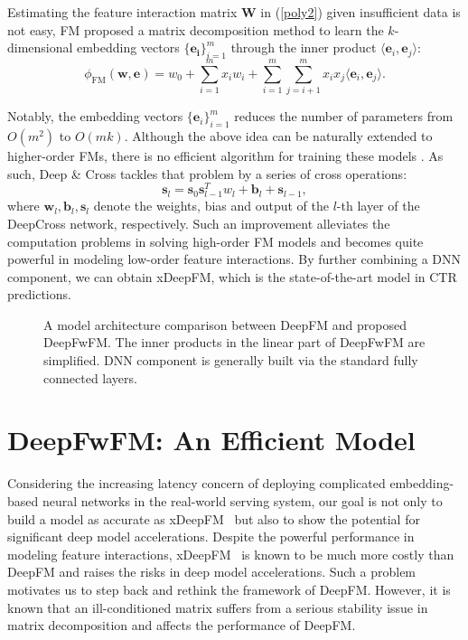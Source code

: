 \documentclass[sigconf]{acmart}
\begin{document}
Estimating the feature interaction matrix $\bm{W}$ in (\ref{poly2}) given insufficient data is not easy, FM \cite{FM} proposed a matrix decomposition method to learn the $k$-dimensional embedding vectors $\{\bm{e_i}\}_{i=1}^m$ through the inner product $\langle \bm{e}_i, \bm{e}_j\rangle$:
\begin{equation}
\label{fm}
        \phi_{\text{FM}}(\bm{w}, \bm{e})=w_0+\sum_{i=1}^m x_i w_i+\sum_{i=1}^m\sum_{j=i+1}^m x_i x_j \langle \bm{e}_i, \bm{e}_j\rangle.
\end{equation}

Notably, the embedding vectors $\{\bm{e}_i\}_{i=1}^m$ reduces the number of parameters from $O(m^2)$ to $O(mk)$. Although the above idea can be naturally extended to higher-order FMs, there is no efficient algorithm for training these models \citep{NIPS2016_6144}. As such, Deep \& Cross \citep{deepcross} tackles that problem by a series of cross operations:
\begin{equation}
    \bm{s}_l= \bm{s}_0 \bm{s}^T_{l-1} w_l+\bm{b}_l+ \bm{s}_{l-1},
\end{equation}
where $\bm{w}_l, \bm{b}_l, \bm{s}_l$ denote the weights, bias and output of the $l$-th layer of the DeepCross network, respectively. Such an improvement alleviates the computation problems in solving high-order FM models and becomes quite powerful in modeling low-order feature interactions. By further combining a DNN component, we can obtain xDeepFM\citep{xdeepfm}, which is the state-of-the-art model in CTR predictions.


\begin{figure*}[h!]
\centering
  \label{fig:2a}\qquad
  \label{fig:2b}
  \caption{A model architecture comparison between DeepFM and proposed DeepFwFM. The inner products in the linear part of DeepFwFM are simplified. DNN component is generally built via the standard fully connected layers.}
  \label{deepFM}
\end{figure*}


\section{DeepFwFM: An Efficient Model}

Considering the increasing latency concern of deploying complicated embedding-based neural networks in the real-world serving system, our goal is not only to build a model as accurate as xDeepFM~\cite{xdeepfm} but also to show the potential for significant deep model accelerations. Despite the powerful performance in modeling feature interactions, xDeepFM~\cite{xdeepfm} is known to be much more costly than DeepFM \citep{xdeepfm, autocross} and raises the risks in deep model accelerations. Such a problem motivates us to step back and rethink the framework of DeepFM. However, it is known that an ill-conditioned matrix suffers from a serious stability issue in matrix decomposition \citep{Michael_Jordan15, Li16} and affects the performance of DeepFM. 
\end{document}
